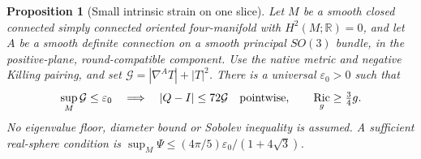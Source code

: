 \documentclass[11pt]{article}
\numberwithin{equation}{section}
\newtheorem{proposition}[theorem]{Proposition}
\theoremstyle{definition}
\theoremstyle{remark}
\DeclareMathOperator{\Ric}{Ric}
\newcommand{\R}{\mathbb R}
\begin{document}
\begin{proposition}[Small intrinsic strain on one slice]
\label{prop:small-intrinsic-strain}
Let \(M\) be a smooth closed connected simply connected oriented
four-manifold with \(H^2(M;\R)=0\), and let \(A\) be a smooth
definite connection on a smooth principal \(SO(3)\) bundle, in the
positive-plane, round-compatible component.
Use the native metric and negative Killing pairing, and set
\(\mathcal G=|\nabla^AT|+|T|^2\).
There is a universal \(\varepsilon_0>0\) such that
\[
 \sup_M\mathcal G\le\varepsilon_0
 \quad\Longrightarrow\quad
 |Q-I|\le72\mathcal G\quad\hbox{pointwise},\qquad
 \Ric_g\ge\tfrac34g.
\]
No eigenvalue floor, diameter bound or Sobolev inequality is assumed.
A sufficient real-sphere condition is
\(\sup_M\Psi\le(4\pi/5)\varepsilon_0/(1+4\sqrt3)\).
\end{proposition}
\end{document}
